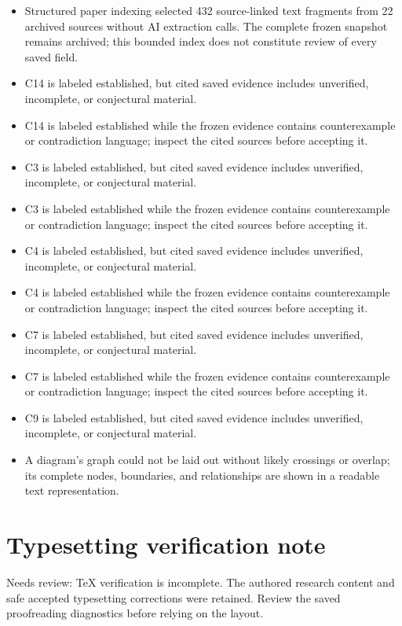\documentclass[11pt]{article}
\begin{document}
\begin{itemize}
\item Structured paper indexing selected 432 source-linked text fragments from 22 archived sources without AI extraction calls. The complete frozen snapshot remains archived; this bounded index does not constitute review of every saved field.
\item C14 is labeled established, but cited saved evidence includes unverified, incomplete, or conjectural material.
\item C14 is labeled established while the frozen evidence contains counterexample or contradiction language; inspect the cited sources before accepting it.
\item C3 is labeled established, but cited saved evidence includes unverified, incomplete, or conjectural material.
\item C3 is labeled established while the frozen evidence contains counterexample or contradiction language; inspect the cited sources before accepting it.
\item C4 is labeled established, but cited saved evidence includes unverified, incomplete, or conjectural material.
\item C4 is labeled established while the frozen evidence contains counterexample or contradiction language; inspect the cited sources before accepting it.
\item C7 is labeled established, but cited saved evidence includes unverified, incomplete, or conjectural material.
\item C7 is labeled established while the frozen evidence contains counterexample or contradiction language; inspect the cited sources before accepting it.
\item C9 is labeled established, but cited saved evidence includes unverified, incomplete, or conjectural material.
\item A diagram's graph could not be laid out without likely crossings or overlap; its complete nodes, boundaries, and relationships are shown in a readable text representation.
\end{itemize}
\section*{Typesetting verification note}
Needs review: TeX verification is incomplete. The authored research content and safe accepted typesetting corrections were retained. Review the saved proofreading diagnostics before relying on the layout.
\end{document}
